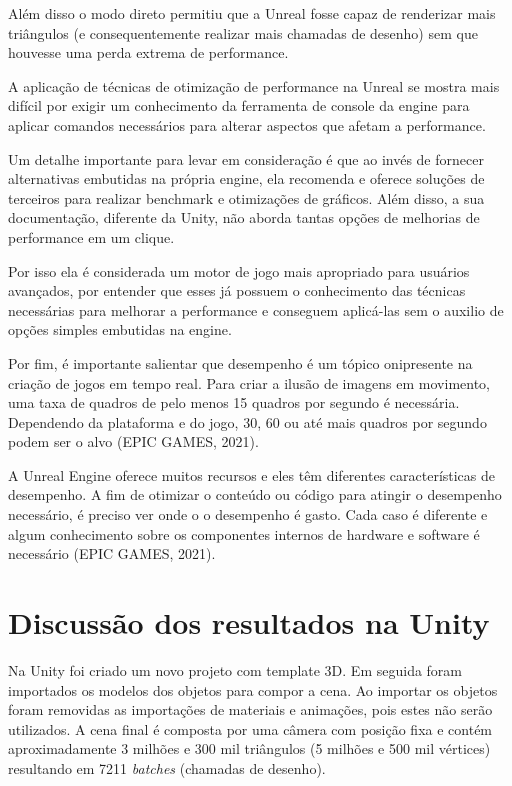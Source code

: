 Além disso o modo direto permitiu que a Unreal fosse capaz de renderizar mais triângulos (e consequentemente realizar mais chamadas de desenho) sem que houvesse uma perda extrema de performance.

A aplicação de técnicas de otimização de performance na Unreal se mostra mais difícil por exigir um conhecimento da ferramenta de console da engine para aplicar comandos necessários para alterar aspectos que afetam a performance.

Um detalhe importante para levar em consideração é que ao invés de fornecer alternativas embutidas na própria engine, ela recomenda e oferece soluções de terceiros para realizar benchmark e otimizações de gráficos. Além disso, a sua documentação, diferente da Unity, não aborda tantas opções de melhorias de performance em um clique. 

Por isso ela é considerada um motor de jogo mais apropriado para usuários avançados, por entender que esses já possuem o conhecimento das técnicas necessárias para melhorar a performance e conseguem aplicá-las sem o auxilio de opções simples embutidas na engine.

Por fim, é importante salientar que desempenho é um tópico onipresente na criação de jogos em tempo real. Para criar a ilusão de imagens em movimento, uma taxa de quadros de pelo menos 15 quadros por segundo é necessária. Dependendo da plataforma e do jogo, 30, 60 ou até mais quadros por segundo podem ser o alvo (EPIC GAMES, 2021).

A Unreal Engine oferece muitos recursos e eles têm diferentes características de desempenho. A fim de otimizar o conteúdo ou código para atingir o desempenho necessário, é preciso ver onde o o desempenho é gasto. Cada caso é diferente e algum conhecimento sobre os componentes internos de hardware e software é necessário (EPIC GAMES, 2021). 


\section{Discussão dos resultados na Unity}
\label{sec:resultado-unity}

Na Unity foi criado um novo projeto com template 3D. Em seguida foram importados os modelos dos objetos para compor a cena. Ao importar os objetos foram removidas as importações de materiais e animações, pois estes não serão utilizados. A cena final é composta por uma câmera com posição fixa e contém aproximadamente 3 milhões e 300 mil triângulos (5 milhões e 500 mil vértices) resultando em 7211 \textit{batches} (chamadas de desenho).

